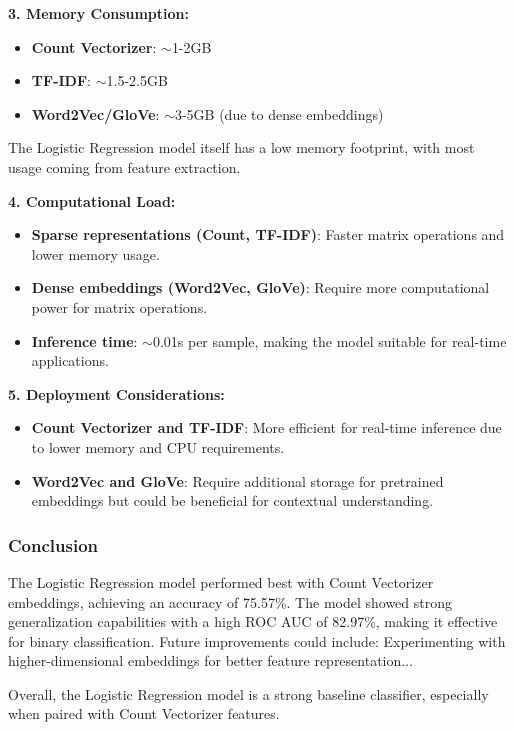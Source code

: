 \textbf{3. Memory Consumption:}  

\begin{itemize}
    \item \textbf{Count Vectorizer}: $\sim$1-2GB  
    \item \textbf{TF-IDF}: $\sim$1.5-2.5GB  
    \item \textbf{Word2Vec/GloVe}: $\sim$3-5GB (due to dense embeddings)  
\end{itemize}
The Logistic Regression model itself has a low memory footprint, with most usage coming from feature extraction.  

\textbf{4. Computational Load:}  

\begin{itemize}
    \item \textbf{Sparse representations (Count, TF-IDF)}: Faster matrix operations and lower memory usage.  
    \item \textbf{Dense embeddings (Word2Vec, GloVe)}: Require more computational power for matrix operations.  
    \item \textbf{Inference time}: $\sim$0.01s per sample, making the model suitable for real-time applications.  
\end{itemize}

\textbf{5. Deployment Considerations:}  

\begin{itemize}
    \item \textbf{Count Vectorizer and TF-IDF}: More efficient for real-time inference due to lower memory and CPU requirements.  
    \item \textbf{Word2Vec and GloVe}: Require additional storage for pretrained embeddings but could be beneficial for contextual understanding.  
\end{itemize}

\subsubsection{Conclusion}

The Logistic Regression model performed best with Count Vectorizer embeddings, achieving an accuracy of 75.57\%. The model showed strong generalization capabilities with a high ROC AUC of 82.97\%, making it effective for binary classification. Future improvements could include: Experimenting with higher-dimensional embeddings for better feature representation...

Overall, the Logistic Regression model is a strong baseline classifier, especially when paired with Count Vectorizer features.

\newpage 
